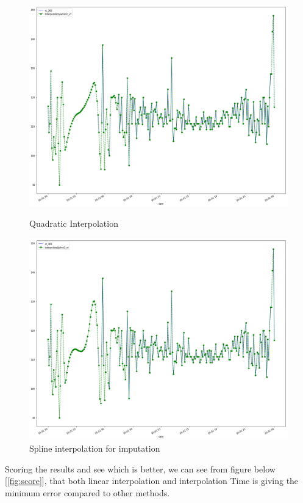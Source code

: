 \begin{figure}[h]
\centering
\begin{minipage}{.49\linewidth}
    \includegraphics[width=.9\textwidth]{img/quadratic.png}    
    \caption{Quadratic Interpolation}
    \label{img1}
\end{minipage}
\hfill
\begin{minipage}{.49\linewidth}
    \includegraphics[width=.9\textwidth]{img/spline.png} 
    \caption{Spline interpolation for imputation}
    \label{img2}
\end{minipage}
\end{figure}


Scoring the results and see which is better, we can see from figure below [\ref{fig:score}], that both linear interpolation and interpolation Time is giving the minimum error compared to other methods.

